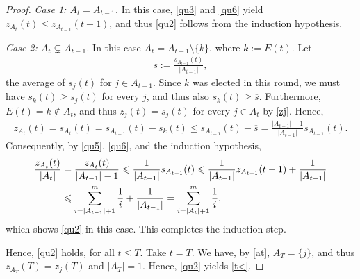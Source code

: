 \documentclass[11pt,reqno,tbtags,a4paper]{amsart}
\numberwithin{equation}{section}
\renewcommand\le{\leq}
\renewcommand\ge{\geq}
\renewcommand\leq{\leqslant}
\renewcommand\geq{\geqslant}
\theoremstyle{plain}%
\theoremstyle{definition}
\theoremstyle{remark}
\newcommand\pfcase[2]{\smallskip\noindent\emph{Case #1: #2} \noindent}
\newcommand\set[1]{\ensuremath{\{#1\}}}
\newcommand\bs{\overline{s}}
\newcommand\0{{\boldsymbol 0}}
\newcommand\1{{\boldsymbol 1}}
\begin{document}
\begin{proof}
\pfcase1{$A_t=A_{t-1}$.}
In this case, \eqref{qu3} and \eqref{qu6} yield
$z_{A_{t}}(t)\le z_{A_{t-1}}(t-1)$, and thus \eqref{qu2} follows from the
induction hypothesis.

\pfcase2{$A_t\subsetneq A_{t-1}$.}
In this case $A_t=A_{t-1}\setminus\set{k}$, where
$k:=E(t)$.
Let 
\begin{align}\label{qu4}
\bs:=\frac{s_{A_{t-1}}(t)}{|A_{t-1}|},
\end{align}
the average of $s_j(t)$ for $j\in A_{t-1}$.
Since $k$ was elected in this round, we must have $s_k(t)\ge s_j(t)$ for
every $j$, and thus also $s_k(t)\ge \bs$.
Furthermore, $E(t)=k\notin A_t$, and thus $z_j(t)=s_j(t)$ for every $j\in
A_t$ by \eqref{zj}. 
Hence,
\begin{align}\label{qu5}
z_{A_t}(t)=s_{A_t}(t)=s_{A_{t-1}}(t)-s_k(t)
\le s_{A_{t-1}}(t)-\bs
=\frac{|A_{t-1}|-1}{|A_{t-1}|}s_{A_{t-1}}(t)
.
\end{align}
%
%
%
%
%
%
Consequently, by \eqref{qu5}, \eqref{qu6},
and the induction hypothesis,
\begin{align}\label{qu7}
\frac{z_{A_t}(t)}{|A_t|}
&
=
\frac{z_{A_t}(t)}{|A_{t-1}|-1}
\le
\frac{1}{|A_{t-1}|}s_{A_{t-1}}(t)
\le \frac{1}{|A_{t-1}|}z_{A_{t-1}}(t-1)
+\frac{1}{|A_{t-1}|}
\notag\\&
\le \sum_{i=|A_{t-1}|+1}^m\frac{1}i
+\frac{1}{|A_{t-1}|}
= \sum_{i=|A_{t}|+1}^m\frac{1}i,
\end{align}
which shows \eqref{qu2} in this case. 
This completes the induction step.

Hence, \eqref{qu2} holds, for all $t\le T$. Take $t=T$.
We have, by \eqref{at},
$A_T=\set j$, and thus $z_{A_T}(T)=z_j(T)$ and $|A_T|=1$. 
Hence, \eqref{qu2} yields \eqref{t<}.
\end{proof}
\end{document}
